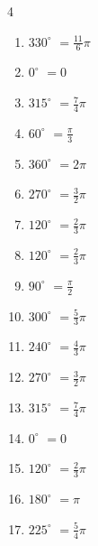 \begin{multicols}{4}
\begin{enumerate}
  \item $\displaystyle 330^{\circ}$
        $\displaystyle =\frac{11}{6}\pi$

  \item $\displaystyle 0^{\circ}$
        $\displaystyle =0$

  \item $\displaystyle 315^{\circ}$
        $\displaystyle =\frac{7}{4}\pi$

  \item $\displaystyle 60^{\circ}$
        $\displaystyle =\frac{\pi}{3}$

  \item $\displaystyle 360^{\circ}$
        $\displaystyle =2\pi$

  \item $\displaystyle 270^{\circ}$
        $\displaystyle =\frac{3}{2}\pi$

  \item $\displaystyle 120^{\circ}$
        $\displaystyle =\frac{2}{3}\pi$

  \item $\displaystyle 120^{\circ}$
        $\displaystyle =\frac{2}{3}\pi$

  \item $\displaystyle 90^{\circ}$
        $\displaystyle =\frac{\pi}{2}$

  \item $\displaystyle 300^{\circ}$
        $\displaystyle =\frac{5}{3}\pi$

  \item $\displaystyle 240^{\circ}$
        $\displaystyle =\frac{4}{3}\pi$

  \item $\displaystyle 270^{\circ}$
        $\displaystyle =\frac{3}{2}\pi$

  \item $\displaystyle 315^{\circ}$
        $\displaystyle =\frac{7}{4}\pi$

  \item $\displaystyle 0^{\circ}$
        $\displaystyle =0$

  \item $\displaystyle 120^{\circ}$
        $\displaystyle =\frac{2}{3}\pi$

  \item $\displaystyle 180^{\circ}$
        $\displaystyle =\pi$

  \item $\displaystyle 225^{\circ}$
        $\displaystyle =\frac{5}{4}\pi$


\end{enumerate}
\end{multicols}
